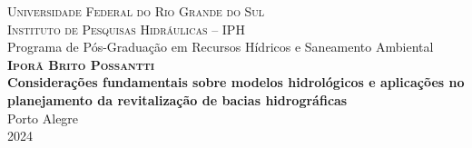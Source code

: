 \documentclass[./main.tex]{subfiles}
\begin{document}
\doublespacing %
\large
\newpage
\thispagestyle{empty}
\begin{center}
	\textsc{Universidade Federal do Rio Grande do Sul} \\	
	\textsc{Instituto de Pesquisas Hidráulicas -- IPH}\\		
	Programa de Pós-Graduação em Recursos Hídricos e Saneamento Ambiental\\
	\vspace{50mm}
	\textsc{\textbf{Iporã Brito Possantti}}\\
	\vspace{40mm}
	\selectfont\textbf{Considerações fundamentais sobre modelos hidrológicos e aplicações no planejamento da revitalização de bacias hidrográficas}\\
	\vspace{80mm}
	Porto Alegre\\
	2024
\end{center}
\clearpage
\end{document}
